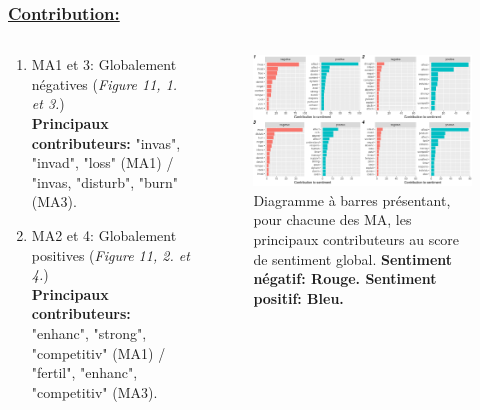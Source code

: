 \documentclass[xcolor=dvipsnames]{beamer}
\begin{document}
	\begin{frame}
		\frametitle{\underline{Contribution:}}
		\begin{columns}
			\begin{column}{0.5\textwidth} %
				\begin{enumerate}
					\item MA1 et 3: Globalement négatives (\textit{Figure 11, 1. et 3.}) \\
					\textbf{Principaux contributeurs:} "invas", "invad", "loss" (MA1) / "invas, "disturb", "burn" (MA3). 
					\item MA2 et 4: Globalement positives (\textit{Figure 11, 2. et 4.}) \\
					\textbf{Principaux contributeurs:} "enhanc", "strong", "competitiv" (MA1) / "fertil", "enhanc", "competitiv" (MA3).
				\end{enumerate}
			\end{column}
			\begin{column}{0.5\textwidth}
				\begin{figure}[htb] %
					\begin{center} %
						\includegraphics[width=1\textwidth]{senti_contri_each.png}
						\caption{Diagramme à barres présentant, pour chacune des MA, les principaux contributeurs au score de sentiment global. \textbf{Sentiment négatif: Rouge. Sentiment positif: Bleu.}}\label{contri_graph}
					\end{center}
				\end{figure}
			\end{column}
		\end{columns}
	\end{frame}
\end{document}

